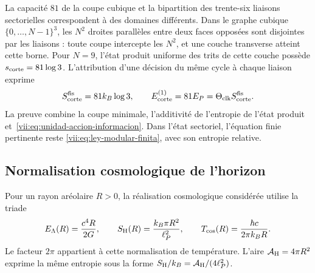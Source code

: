La capacité \(81\) de la coupe cubique et la bipartition des trente-six liaisons sectorielles correspondent à des domaines différents. Dans le graphe cubique \(\{0,\ldots,N-1\}^3\), les \(N^2\) droites parallèles entre deux faces opposées sont disjointes par les liaisons : toute coupe intercepte les \(N^2\), et une couche transverse atteint cette borne. Pour \(N=9\), l'état produit uniforme des trits de cette couche possède \(s_{\rm corte}=81\log3\). L'attribution d'une décision du même cycle à chaque liaison exprime
\begin{equation}
 S_{\rm corte}^{\rm fis}=81k_B\log3,\qquad
 E_{\rm corte}^{(1)}=81E_P
                  =\Theta_{\rm clk}S_{\rm corte}^{\rm fis}.
 \label{vii:eq:corte-energia-informacion}
\end{equation}
La preuve combine la coupe minimale, l'additivité de l'entropie de l'état produit et~\eqref{vii:eq:unidad-accion-informacion}. Dans l'état sectoriel, l'équation finie pertinente reste \eqref{vii:eq:ley-modular-finita}, avec son entropie relative.

\subsection{Normalisation cosmologique de l'horizon}
\label{vii:subsec:balance-horizonte}

Pour un rayon aréolaire \(R>0\), la réalisation cosmologique considérée utilise la triade
\begin{equation}
 E_\Lambda(R)=\frac{c^4R}{2G},\qquad
 S_{\rm H}(R)=\frac{k_B\pi R^2}{\ell_P^2},\qquad
 T_{\rm cos}(R)=\frac{\hbar c}{2\pi k_BR}.
 \label{vii:eq:horizonte-cosmologico}
\end{equation}
Le facteur \(2\pi\) appartient à cette normalisation de température.
L'aire \(\mathcal A_{\rm H}=4\pi R^2\) exprime la même entropie
sous la forme \(S_{\rm H}/k_B=\mathcal A_{\rm H}/(4\ell_P^2)\).

